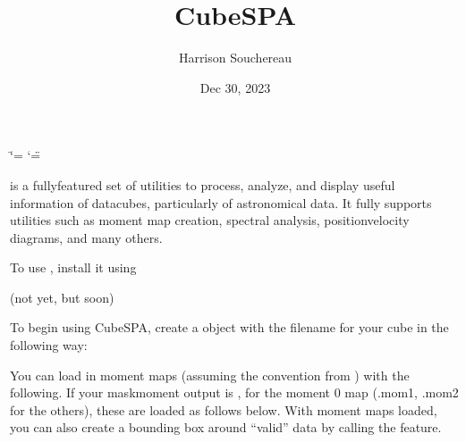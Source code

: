 \documentclass[letterpaper,10pt,english]{sphinxmanual}
\title{CubeSPA}
\date{Dec 30, 2023}
\author{Harrison Souchereau}
\begin{document}
\ifdefined\shorthandoff
  \ifnum\catcode`\=\string=\active\shorthandoff{=}\fi
  \ifnum\catcode`\"=\active{}\fi
\fi

\pagestyle{empty}
\sphinxmaketitle
\pagestyle{plain}
\sphinxtableofcontents
\pagestyle{normal}
\label{\detokenize{index::doc}}


\sphinxAtStartPar
{} is a fully\sphinxhyphen{}featured set of utilities to process, analyze, and display useful information of datacubes, particularly
of astronomical data. It fully supports utilities such as moment map creation, spectral analysis, position\sphinxhyphen{}velocity diagrams, and
many others.

\sphinxAtStartPar
To use , install it using

\sphinxAtStartPar
{} (not yet, but soon)

\sphinxAtStartPar
To begin using CubeSPA, create a  object with the filename for your cube in the following way:

\begin{sphinxVerbatim}[commandchars=\\\{\}]
  
  
\end{sphinxVerbatim}

\sphinxAtStartPar
You can load in moment maps (assuming the convention from   ) with the following. If your maskmoment output is
, for the moment 0 map (.mom1, .mom2 for the others), these are loaded as follows below. With
moment maps loaded, you can also create a bounding box around “valid” data by calling the  feature.

\begin{sphinxVerbatim}[commandchars=\\\{\}]
  
  
    
\end{sphinxVerbatim}
\end{document}
